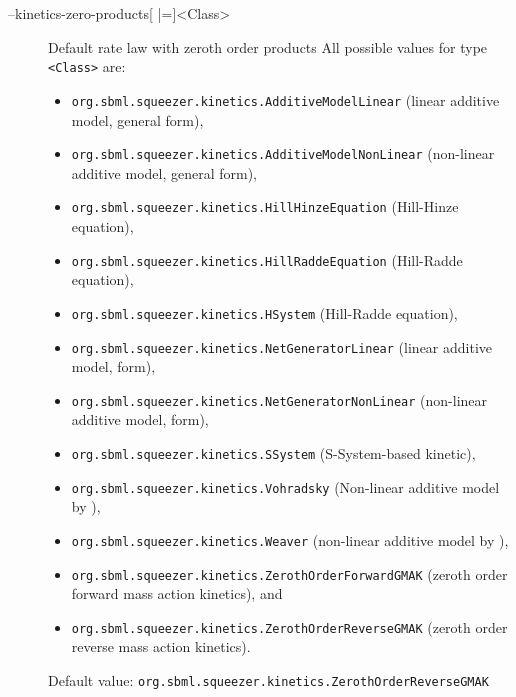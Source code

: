 \begin{description}
\item[--kinetics-zero-products{[} |={]}<Class>]
  Default rate law with zeroth order products
  All possible values for type \texttt{<Class>} are:
  \begin{itemize}
  \item\texttt{org.sbml.squeezer.kinetics.AdditiveModelLinear} (linear additive model, general form),
  \item\texttt{org.sbml.squeezer.kinetics.AdditiveModelNonLinear} (non-linear additive model, general form),
  \item\texttt{org.sbml.squeezer.kinetics.HillHinzeEquation} (Hill-Hinze equation),
  \item\texttt{org.sbml.squeezer.kinetics.HillRaddeEquation} (Hill-Radde equation),
  \item\texttt{org.sbml.squeezer.kinetics.HSystem} (Hill-Radde equation),
  \item\texttt{org.sbml.squeezer.kinetics.NetGeneratorLinear} (linear additive model, \NetGenerator form),
  \item\texttt{org.sbml.squeezer.kinetics.NetGeneratorNonLinear} (non-linear additive model, \NetGenerator form),
  \item\texttt{org.sbml.squeezer.kinetics.SSystem} (S-System-based kinetic),
  \item\texttt{org.sbml.squeezer.kinetics.Vohradsky} (Non-linear additive model by \citealp*{Vu2007}),
  \item\texttt{org.sbml.squeezer.kinetics.Weaver} (non-linear additive model by \citealp{Weaver1999}),
  \item\texttt{org.sbml.squeezer.kinetics.ZerothOrderForwardGMAK} (zeroth order forward mass action kinetics), and
  \item\texttt{org.sbml.squeezer.kinetics.ZerothOrderReverseGMAK} (zeroth order reverse mass action kinetics).
  \end{itemize}
  Default value: \texttt{org.sbml.squeezer.kinetics.ZerothOrderReverseGMAK}
\end{description}

